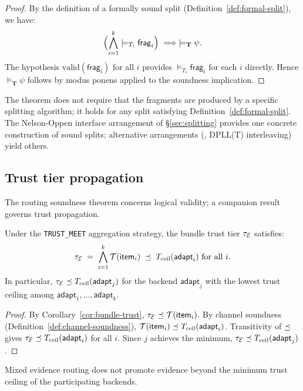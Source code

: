 \documentclass[11pt]{article}
\newcommand{\VC}{\psi}                    %
\newcommand{\Frag}[1]{\mathsf{frag}_{#1}} %
\newcommand{\BAdapt}{\mathsf{adapt}}      %
\newcommand{\valid}[1]{\mathrm{valid}(#1)}
\begin{document}
\begin{proof}
By the definition of a formally sound split
(Definition~\ref{def:formal-split}), we have:
\[
  \Bigl(\bigwedge_{i=1}^k \models_{T_i} \Frag{i}\Bigr)
  \implies
  \models_{\mathbf{T}} \VC.
\]
The hypothesis $\valid{\Frag{i}}$ for all $i$ provides
$\models_{T_i} \Frag{i}$ for each $i$ directly.
Hence $\models_{\mathbf{T}} \VC$ follows by modus ponens applied to
the soundness implication.
\end{proof}

\begin{remark}
The theorem does not require that the fragments are produced by a
specific splitting algorithm; it holds for any split satisfying
Definition~\ref{def:formal-split}.  The Nelson-Oppen interface
arrangement of \S\ref{sec:splitting} provides one concrete
construction of sound splits; alternative arrangements (\eg,
DPLL(T) interleaving) yield others.
\end{remark}

\subsection{Trust tier propagation}\label{sec:trust-prop}

The routing soundness theorem concerns logical validity; a companion
result governs trust propagation.

\begin{theorem}\label{thm:trust-reassembly}
Under the \texttt{TRUST\_MEET} aggregation strategy, the bundle trust
tier $\tau_{\mathcal{E}}$ satisfies:
\[
  \tau_\evid
  \;=\;
  \bigwedge_{i=1}^k \trust(\mathsf{item}_i)
  \;\tleq\;
  T_{\mathrm{ceil}}(\BAdapt_i) \text{ for all } i.
\]
In particular, $\tau_\evid \tleq T_{\mathrm{ceil}}(\BAdapt_j)$ for
the backend $\BAdapt_j$ with the lowest trust ceiling among
$\BAdapt_1, \ldots, \BAdapt_k$.
\end{theorem}

\begin{proof}
By Corollary~\ref{cor:bundle-trust}, $\tau_{\mathcal{E}} \preceq \mathcal{T}(\mathsf{item}_i)$.
By channel soundness (Definition~\ref{def:channel-soundness}),
$\trust(\mathsf{item}_i) \tleq T_{\mathrm{ceil}}(\BAdapt_i)$.
Transitivity of $\preceq$ gives
$\tau_\evid \tleq T_{\mathrm{ceil}}(\BAdapt_i)$ for all $i$.
Since $j$ achieves the minimum, $\tau_\evid \tleq T_{\mathrm{ceil}}(\BAdapt_j)$.
\end{proof}

\begin{corollary}\label{cor:no-promo}
Mixed evidence routing does not promote evidence beyond the minimum
trust ceiling of the participating backends.
\end{corollary}
\end{document}
